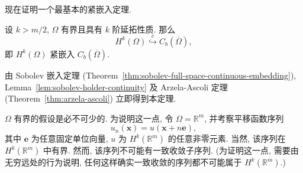 现在证明一个最基本的紧嵌入定理.

\begin{Theorem}
\label{thm:sobolev-continuous-target-compact-embedding}
设 $k>m/2$, $\Omega$ 有界且具有 $k$ 阶延拓性质. 那么\[H^k(\Omega)\overset{c}{\hookrightarrow}C_b(\overline\Omega),\]即 $H^k(\Omega)$ 紧嵌入 $C_b(\overline\Omega)$.
\end{Theorem}

\begin{Proof}
由 Sobolev 嵌入定理 (Theorem~\ref{thm:sobolev-full-space-continuous-embedding}), Lemma~\ref{lem:sobolev-holder-continuity} 及 Arzela-Ascoli 定理 (Theorem~\ref{thm:arzela-ascoli}) 立即得到本定理.
\end{Proof}

\begin{Example}
\label{ex:unbounded-domain-translated-functions-noncompactness}
$\Omega$ 有界的假设是必不可少的. 为说明这一点, 令 $\Omega=\mathbb{R}^m$, 并考察平移函数序列\[u_n(\bm{x})=u(\bm{x}+n\bm{e}),\]其中 $\bm{e}$ 为任意固定单位向量, $u$ 为 $H^k(\mathbb{R}^m)$ 的任意非零元素. 当然, 该序列在 $H^k(\mathbb{R}^m)$ 中有界. 然而, 该序列不可能有一致收敛子序列. (为证明这一点, 需要由无穷远处的行为说明, 任何这样确实一致收敛的序列都不可能属于 $H^k(\mathbb{R}^m)$.)
\end{Example}
